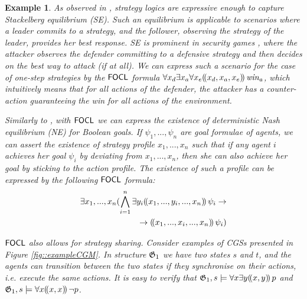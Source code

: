 \documentclass{article}
\newtheorem{example}{Example}
\begin{document}
\begin{example}
As observed in \cite{belardinelli19}, strategy logics are expressive enough to capture %
\textit{Stackelberg equilibrium} (SE). Such an equilibrium is applicable to scenarios where a leader commits to a strategy, and the follower, observing the strategy of the leader, provides her best response. SE is prominent in security games \cite{sinha18}, where the attacker observes the defender committing to a defensive strategy and then decides on the best way to attack (if at all). We can express such a scenario for the case of one-step strategies by the $\mathsf{FOCL}$ formula $\forall x_d \exists x_a \forall x_e (\!( x_d, x_a, x_e )\!)\, \mathit{win_a}$, which intuitively means that for all actions of the defender, the attacker has a counter-action guaranteeing the win for all actions of the environment.    

Similarly to \cite{mogavero10}, with $\mathsf{FOCL}$ we can express the existence of deterministic \textit{Nash equilibrium} (NE) for Boolean goals. If $\psi_1, ..., \psi_n$ are goal formulae of agents, we can assert the existence of strategy profile $x_1,...,x_n$ such that if any agent $i$ achieves her goal $\psi_i$ by deviating from $x_1,...,x_n$, then she can also achieve her goal by sticking to the action profile. The existence of such a profile can be expressed by the following $\mathsf{FOCL}$ formula:
\begin{align*}
\exists x_1, ..., x_n (\bigwedge_{i=1}^n \exists y_i (\!( x_1,..., y_i, ..., x_n )\!)\,\psi_i \to \\
\to (\!( x_1,..., x_i, ..., x_n )\!)\, \psi_i)
\end{align*}

$\mathsf{FOCL}$ also allows for strategy sharing. Consider examples of CGSs presented in Figure \ref{fig::exampleCGM}. In structure $\mathfrak{G}_1$ we have two states $s$ and $t$, and the agents can transition between the two states if they synchronise on their actions, i.e. execute the same actions. It is easy to verify that $\mathfrak{G}_1,s \models \forall x \exists y (\!( x,y )\!)\, p$ and $\mathfrak{G}_1, s \models \forall x (\!( x,x )\!)\, \lnot p$.
\end{example}
\end{document}
